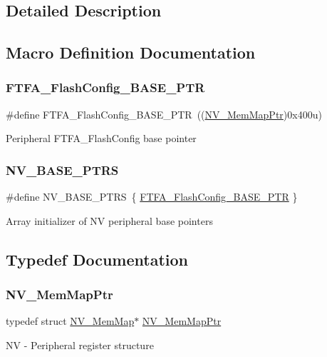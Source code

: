 \subsection{Detailed Description}


\subsection{Macro Definition Documentation}
\mbox{\label{group___n_v___peripheral_ga3458652dfc38239f92682556e63596b5}} 
\subsubsection{\texorpdfstring{F\+T\+F\+A\+\_\+\+Flash\+Config\+\_\+\+B\+A\+S\+E\+\_\+\+P\+TR}{FTFA\_FlashConfig\_BASE\_PTR}}
{\footnotesize\ttfamily \#define F\+T\+F\+A\+\_\+\+Flash\+Config\+\_\+\+B\+A\+S\+E\+\_\+\+P\+TR~((\hyperlink{group___n_v___peripheral_ga9aac431b01e6b976f2f4e32409ab725f}{N\+V\+\_\+\+Mem\+Map\+Ptr})0x400u)}

Peripheral F\+T\+F\+A\+\_\+\+Flash\+Config base pointer \mbox{\label{group___n_v___peripheral_ga1e44e66a8945b675dcebb6fbd6bdc85b}} 
\subsubsection{\texorpdfstring{N\+V\+\_\+\+B\+A\+S\+E\+\_\+\+P\+T\+RS}{NV\_BASE\_PTRS}}
{\footnotesize\ttfamily \#define N\+V\+\_\+\+B\+A\+S\+E\+\_\+\+P\+T\+RS~\{ \hyperlink{group___n_v___peripheral_ga3458652dfc38239f92682556e63596b5}{F\+T\+F\+A\+\_\+\+Flash\+Config\+\_\+\+B\+A\+S\+E\+\_\+\+P\+TR} \}}

Array initializer of NV peripheral base pointers 

\subsection{Typedef Documentation}
\mbox{\label{group___n_v___peripheral_ga9aac431b01e6b976f2f4e32409ab725f}} 
\subsubsection{\texorpdfstring{N\+V\+\_\+\+Mem\+Map\+Ptr}{NV\_MemMapPtr}}
{\footnotesize\ttfamily typedef struct \hyperlink{struct_n_v___mem_map}{N\+V\+\_\+\+Mem\+Map}$\ast$ \hyperlink{group___n_v___peripheral_ga9aac431b01e6b976f2f4e32409ab725f}{N\+V\+\_\+\+Mem\+Map\+Ptr}}

NV -\/ Peripheral register structure 